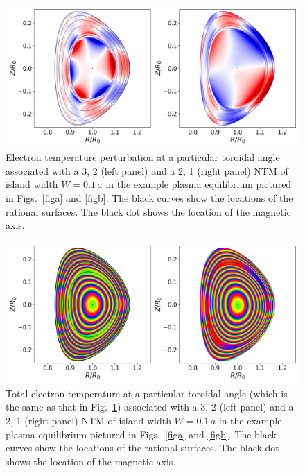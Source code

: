 \documentclass{iopjournal}
\begin{document}
\begin{figure}
\centerline{\includegraphics[width=\textwidth]{Fig13.png}}
\caption{Electron temperature perturbation at a particular toroidal angle associated with a 3, 2 (left panel) and a 2, 1 (right panel) NTM of island width $W=0.1\,a$ in the example plasma equilibrium pictured in Figs.~\ref{figa}
and \ref{figb}. The black curves show the locations of the rational surfaces. The black dot shows the location of the magnetic axis.\label{fig11}}
\end{figure}

\begin{figure}
\centerline{\includegraphics[width=\textwidth]{Fig14.png}}
\caption{Total electron temperature  at a particular toroidal angle (which is the same as that in Fig.~\ref{fig11}) associated with a 3, 2 (left panel) and a 2, 1 (right panel) NTM of island width $W=0.1\,a$  in the example plasma equilibrium pictured in Figs.~\ref{figa}
and \ref{figb}. The black curves show the locations of the rational surfaces. The black dot shows the location of the magnetic axis.\label{fig12}}
\end{figure}
\end{document}
